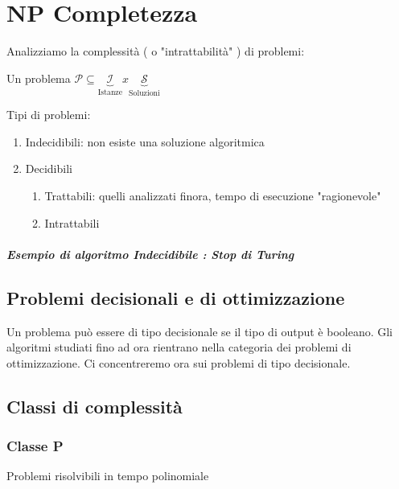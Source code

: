\chapter{NP Completezza}

Analizziamo la complessità ( o  "intrattabilità" ) di problemi:

Un problema $\mathcal{P} \subseteq \underbrace{\mathcal{I} }_\text{Istanze} x  \underbrace{\mathcal{S} }_\text{Soluzioni}$

Tipi di problemi:

\begin{enumerate}

\item Indecidibili: non esiste una soluzione algoritmica
\item Decidibili
\begin{enumerate}
\item Trattabili: quelli analizzati finora, tempo di esecuzione "ragionevole"
\item Intrattabili
\end{enumerate}

\end{enumerate}

\paragraph{Esempio di algoritmo Indecidibile : Stop di Turing}


\section{Problemi decisionali e di ottimizzazione}

Un problema può essere di tipo decisionale se il tipo di output è booleano. Gli algoritmi studiati fino ad ora rientrano nella categoria dei problemi di ottimizzazione. Ci concentreremo ora sui problemi di tipo decisionale.

\section{Classi di complessità}



\subsection{Classe P}
Problemi risolvibili in tempo polinomiale

